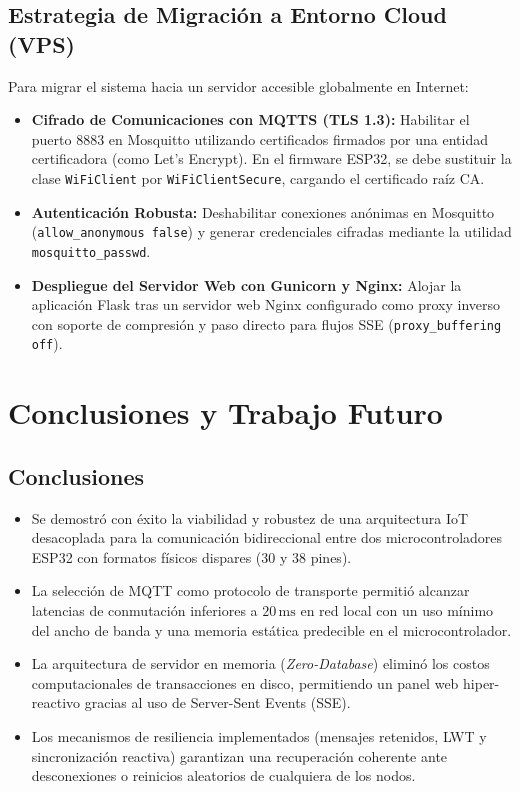 \documentclass[11pt,a4paper]{article}
\begin{document}
\subsection{Estrategia de Migración a Entorno Cloud (VPS)}
Para migrar el sistema hacia un servidor accesible globalmente en Internet:
\begin{itemize}
    \item \textbf{Cifrado de Comunicaciones con MQTTS (TLS 1.3):} Habilitar el puerto 8883 en Mosquitto utilizando certificados firmados por una entidad certificadora (como Let's Encrypt). En el firmware ESP32, se debe sustituir la clase \texttt{WiFiClient} por \texttt{WiFiClientSecure}, cargando el certificado raíz CA.
    \item \textbf{Autenticación Robusta:} Deshabilitar conexiones anónimas en Mosquitto (\texttt{allow\_anonymous false}) y generar credenciales cifradas mediante la utilidad \texttt{mosquitto\_passwd}.
    \item \textbf{Despliegue del Servidor Web con Gunicorn y Nginx:} Alojar la aplicación Flask tras un servidor web Nginx configurado como proxy inverso con soporte de compresión y paso directo para flujos SSE (\texttt{proxy\_buffering off}).
\end{itemize}

\section{Conclusiones y Trabajo Futuro}

\subsection{Conclusiones}
\begin{itemize}
    \item Se demostró con éxito la viabilidad y robustez de una arquitectura IoT desacoplada para la comunicación bidireccional entre dos microcontroladores ESP32 con formatos físicos dispares (30 y 38 pines).
    \item La selección de MQTT como protocolo de transporte permitió alcanzar latencias de conmutación inferiores a $20\,\text{ms}$ en red local con un uso mínimo del ancho de banda y una memoria estática predecible en el microcontrolador.
    \item La arquitectura de servidor en memoria (\textit{Zero-Database}) eliminó los costos computacionales de transacciones en disco, permitiendo un panel web hiper-reactivo gracias al uso de Server-Sent Events (SSE).
    \item Los mecanismos de resiliencia implementados (mensajes retenidos, LWT y sincronización reactiva) garantizan una recuperación coherente ante desconexiones o reinicios aleatorios de cualquiera de los nodos.
\end{itemize}
\end{document}
